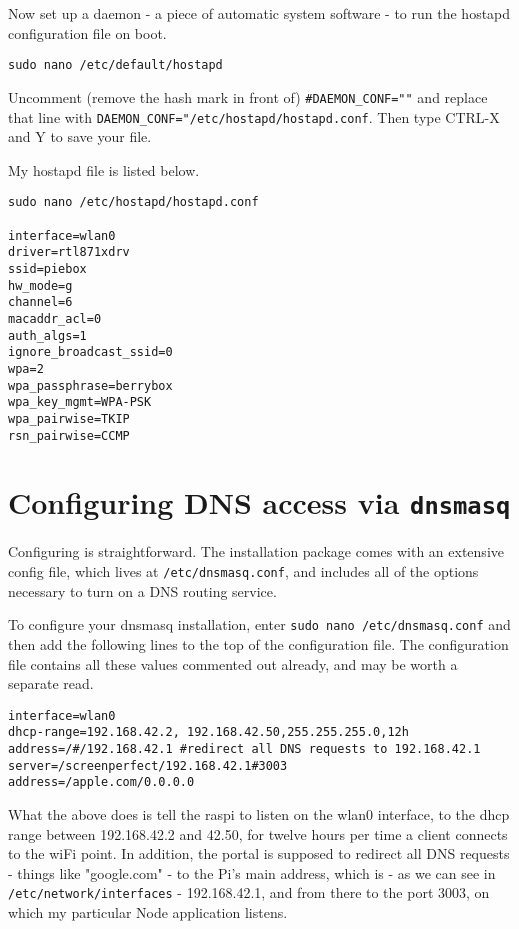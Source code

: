 Now set up a daemon - a piece of automatic system software - to run the hostapd configuration file on boot.
\begin{lstlisting}
sudo nano /etc/default/hostapd
\end{lstlisting}
Uncomment (remove the hash mark in front of) \texttt{#DAEMON_CONF=""} and replace that line with \texttt{DAEMON_CONF="/etc/hostapd/hostapd.conf}.
Then type CTRL-X and Y to save your file.

My hostapd file is listed below.

\begin{lstlisting}
sudo nano /etc/hostapd/hostapd.conf

interface=wlan0
driver=rtl871xdrv
ssid=piebox
hw_mode=g
channel=6
macaddr_acl=0
auth_algs=1
ignore_broadcast_ssid=0
wpa=2
wpa_passphrase=berrybox
wpa_key_mgmt=WPA-PSK
wpa_pairwise=TKIP
rsn_pairwise=CCMP

\end{lstlisting}


\section{Configuring DNS access via \texttt{dnsmasq}}

Configuring  is straightforward. The installation package comes with an extensive config file, which lives at \texttt{/etc/dnsmasq.conf}, and includes all of the options necessary to turn on a DNS routing service.

To configure your dnsmasq installation, enter \texttt{sudo nano /etc/dnsmasq.conf} and then add the following lines to the top of the configuration file. The configuration file contains all these values commented out already, and may be worth a separate read.

\begin{lstlisting}
interface=wlan0
dhcp-range=192.168.42.2, 192.168.42.50,255.255.255.0,12h
address=/#/192.168.42.1 #redirect all DNS requests to 192.168.42.1
server=/screenperfect/192.168.42.1#3003
address=/apple.com/0.0.0.0
\end{lstlisting}

What the above does is tell the raspi to listen on the wlan0 interface, to the dhcp range between 192.168.42.2 and 42.50, for twelve hours per time a client connects to the wiFi point. In addition, the portal is supposed to redirect all DNS requests - things like "google.com" - to the Pi's main address, which is - as we can see in \texttt{/etc/network/interfaces} - 192.168.42.1, and from there to the port 3003, on which my particular Node application listens.

